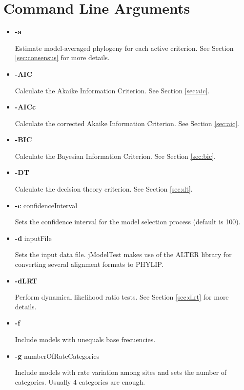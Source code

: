 \section{Command Line Arguments}
\label{sec:arguments}

\begin{itemize}

\item  {\bf -a}

Estimate model-averaged phylogeny for each active criterion. See Section \ref{sec:consensus} for more details.

\item  {\bf -AIC}

Calculate the Akaike Information Criterion. See Section \ref{sec:aic}.

\item  {\bf -AICc}

Calculate the corrected Akaike Information Criterion. See Section \ref{sec:aic}.

\item  {\bf -BIC}

Calculate the Bayesian Information Criterion. See Section \ref{sec:bic}.

\item  {\bf -DT}

Calculate the decision theory criterion. See Section \ref{sec:dt}.

\item  {\bf -c} confidenceInterval

Sets the confidence interval for the model selection process (default is 100).

\item  {\bf -d} inputFile

Sets the input data file. jModelTest makes use of the ALTER library for converting several alignment formats to PHYLIP.

\item  {\bf -dLRT}

Perform dynamical likelihood ratio tests. See Section \ref{sec:dlrt} for more details.

\item  {\bf -f}

Include models with unequals base frecuencies.

\item  {\bf -g} numberOfRateCategories

Include models with rate variation among sites and sets the number of categories. Usually 4 categories are enough.


\end{itemize}
